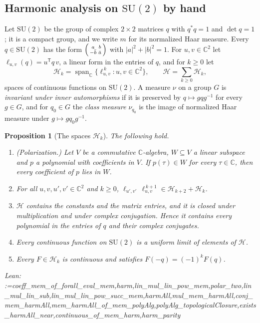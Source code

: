 \documentclass[11pt]{amsart}
\makeatletter
\newtheorem{proposition}[theorem]{Proposition}
\theoremstyle{definition}
\theoremstyle{remark}
\newcommand{\@leanlist}[1]{\def\@leansep{}\@for\@leanname:=#1\do{\@leansep
  \texttt{\expandafter\detokenize\expandafter{\@leanname}}\def\@leansep{, }}}
\newcommand{\lean}[1]{\par\smallskip\noindent
  {\footnotesize\normalfont\raggedright\textsf{Lean:} \@leanlist{#1}\par}}
\newcommand{\C}{\mathbb{C}}
\newcommand{\transp}{^{\mathsf T}}
\makeatother
\begin{document}
\subsection{Harmonic analysis on \texorpdfstring{$\mathrm{SU}(2)$}{SU(2)} by hand}\label{sec:su2}
Let $\mathrm{SU}(2)$ be the group of complex $2\times2$ matrices $q$ with $q^*q=1$ and
$\det q=1$; it is a compact group, and we write $m$ for its normalized Haar measure.  Every
$q\in\mathrm{SU}(2)$ has the form
$\begin{psmallmatrix}a&b\\-\bar b&\bar a\end{psmallmatrix}$ with $|a|^2+|b|^2=1$.  For
$u,v\in\C^2$ let $\ell_{u,v}(q)=u\transp q\,v$, a linear form in the entries of $q$, and for
$k\ge0$ let
\[
  \mathcal H_k=\operatorname{span}_\C\bigl\{\ell_{u,v}^{\,k}:u,v\in\C^2\bigr\},\qquad
  \mathcal H=\sum_{k\ge0}\mathcal H_k ,
\]
spaces of continuous functions on $\mathrm{SU}(2)$.  A measure $\nu$ on a group $G$ is
\emph{invariant under inner automorphisms} if it is preserved by $q\mapsto gqg^{-1}$ for every
$g\in G$, and for $q_0\in G$ the \emph{class measure} $\nu_{q_0}$ is the image of normalized
Haar measure under $g\mapsto gq_0g^{-1}$.

\begin{proposition}[The spaces $\mathcal H_k$]\label{prop:su2-complete}
The following hold.
\begin{enumerate}
\item[(a)] (Polarization.)  Let $V$ be a commutative $\C$-algebra, $W\subseteq V$ a linear
subspace and $p$ a polynomial with coefficients in $V$.  If $p(\tau)\in W$ for every
$\tau\in\C$, then every coefficient of $p$ lies in $W$.
\item[(b)] For all $u,v,u',v'\in\C^2$ and $k\ge0$,
$\ell_{u',v'}\,\ell_{u,v}^{\,k+1}\in\mathcal H_{k+2}+\mathcal H_k$.
\item[(c)] $\mathcal H$ contains the constants and the matrix entries, and it is closed under
multiplication and under complex conjugation.  Hence it contains every polynomial in the entries
of $q$ and their complex conjugates.
\item[(d)] Every continuous function on $\mathrm{SU}(2)$ is a uniform limit of elements of
$\mathcal H$.
\item[(e)] Every $F\in\mathcal H_k$ is continuous and satisfies $F(-q)=(-1)^kF(q)$.
\end{enumerate}
\lean{coeff_mem_of_forall_eval_mem,harm,lin_mul_lin_pow_mem,polar_two,lin_mul_lin_sub,lin_mul_lin_pow_succ_mem,harmAll,mul_mem_harmAll,conj_mem_harmAll,mem_harmAll_of_mem_polyAlg,polyAlg_topologicalClosure,exists_harmAll_near,continuous_of_mem_harm,harm_parity}
\end{proposition}
\end{document}
